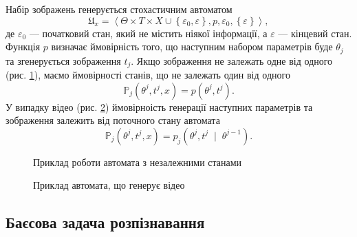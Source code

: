 Набір зображень генерується стохастичним автоматом \cite{Rabin:1963}
\begin{equation*}
  \mathfrak{U}_x = \left\langle
    \Theta \times T \times X
      \cup \left\{ \varepsilon_0, \varepsilon \right\}, p, \varepsilon_0,
    \left\{ \varepsilon \right\}
  \right\rangle,
\end{equation*}
де $\varepsilon_0$ --- початковий стан, який не містить ніякої інформації,
а $\varepsilon$ --- кінцевий стан.
Функція $p$ визначає ймовірність того,
що наступним набором параметрів буде $\theta_j$
та згенерується зображення $t_j$.
Якщо зображення не залежать одне від одного
(рис. \ref{fig:solutions:tree-images}),
маємо ймовірності станів,
що не залежать один від одного
\begin{equation*}
  \mathbb{P}_j\left( \theta^j, t^j, x \right)
  = p\left( \theta^j, t^j \right).
\end{equation*}
У випадку відео (рис. \ref{fig:solutions:tree-video})
ймовірноість генерації наступних параметрів та зображення
залежить від поточного стану автомата
\begin{equation*}
  \mathbb{P}_j\left( \theta^j, t^j, x \right)
  = p_j\left( \theta^j, t^j \; \mid \; \theta^{j-1} \right).
\end{equation*}

\begin{figure}[h]
  \centering
  
  \caption{Приклад роботи автомата з незалежними станами}
  \label{fig:solutions:tree-images}
\end{figure}

\begin{figure}[h]
  \centering
  
  \caption{Приклад автомата, що генерує відео}
  \label{fig:solutions:tree-video}
\end{figure}

\subsection{Баєсова задача розпізнавання}

